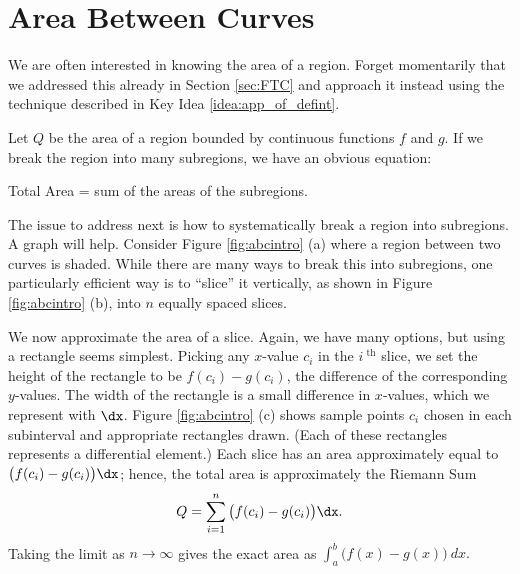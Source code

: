 \section{Area Between Curves}\label{sec:ABC}

We are often interested in knowing the area of a region. Forget momentarily that we addressed this already in Section \ref{sec:FTC} and approach it instead using the technique described in Key Idea \ref{idea:app_of_defint}. 

Let $Q$ be the area of a region bounded by continuous functions $f$ and $g$. If we break the region into many subregions, we have an obvious equation:

\begin{center}
Total Area = sum of the areas of the subregions.
\end{center}

The issue to address next is how to systematically break a region into subregions. A graph will help. Consider Figure \ref{fig:abcintro} (a) where a region between two curves is shaded. While there are many ways to break this into subregions, one particularly efficient way is to ``slice'' it vertically, as shown in Figure \ref{fig:abcintro} (b), into $n$ equally spaced slices. 

We now approximate the area of a slice. Again, we have many options, but using a rectangle seems simplest. Picking any $x$-value $c_i$ in the $i^\text{ th}$ slice, we set the height of the rectangle to be $f(c_i)-g(c_i)$, the difference of the corresponding $y$-values. The width of the rectangle is a small difference in $x$-values, which we represent with $\dx$. Figure \ref{fig:abcintro} (c) shows sample points $c_i$ chosen in each subinterval and appropriate rectangles drawn. (Each of these rectangles represents a differential element.) Each slice has an area approximately equal to $\big(f(c_i)-g(c_i)\big)\dx$; hence, the total area is approximately the Riemann Sum
$$Q = \sum_{i=1}^n \big(f(c_i)-g(c_i)\big)\dx.$$
Taking the limit as $n\to \infty$ gives the exact area as $\int_a^b \big(f(x)-g(x)\big)\ dx.$


